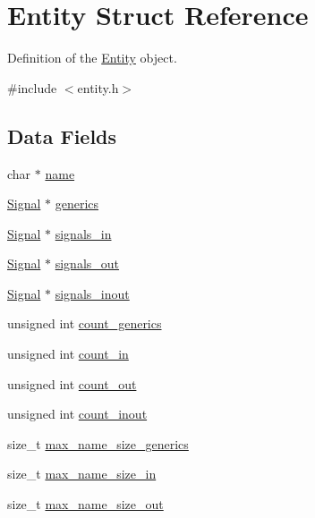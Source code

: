 \hypertarget{struct_entity}{}\section{Entity Struct Reference}
\label{struct_entity}


Definition of the \mbox{\hyperlink{struct_entity}{Entity}} object.  




{\ttfamily \#include $<$entity.\+h$>$}

\subsection*{Data Fields}
\begin{DoxyCompactItemize}
\item 
char $\ast$ \mbox{\hyperlink{struct_entity_a861f653e2ffbe97c0deed7ab85eb7ce6}{name}}
\item 
\mbox{\hyperlink{struct_signal}{Signal}} $\ast$ \mbox{\hyperlink{struct_entity_a92738012e3a6611f840cf0eb2813c2e6}{generics}}
\item 
\mbox{\hyperlink{struct_signal}{Signal}} $\ast$ \mbox{\hyperlink{struct_entity_a52dafc8055e7c6c1b21520fad2d703b2}{signals\+\_\+in}}
\item 
\mbox{\hyperlink{struct_signal}{Signal}} $\ast$ \mbox{\hyperlink{struct_entity_a4b9a333d9fb207c09d9f64e87d986ad6}{signals\+\_\+out}}
\item 
\mbox{\hyperlink{struct_signal}{Signal}} $\ast$ \mbox{\hyperlink{struct_entity_a3a7a0540c9a581600cae6cb8880d4175}{signals\+\_\+inout}}
\item 
unsigned int \mbox{\hyperlink{struct_entity_a20a2de116010cce381f1127dae0b2218}{count\+\_\+generics}}
\item 
unsigned int \mbox{\hyperlink{struct_entity_a92911aaab51c820215510b0546570b64}{count\+\_\+in}}
\item 
unsigned int \mbox{\hyperlink{struct_entity_a0cc932f4ed6b00e372488b3a753674ac}{count\+\_\+out}}
\item 
unsigned int \mbox{\hyperlink{struct_entity_a54b70a8bdd98d2752f6ff9f261c552fd}{count\+\_\+inout}}
\item 
size\+\_\+t \mbox{\hyperlink{struct_entity_a8b0c53c2f6867fd1c011210e63efcaad}{max\+\_\+name\+\_\+size\+\_\+generics}}
\item 
size\+\_\+t \mbox{\hyperlink{struct_entity_ae224ddbebe0375e2b802c08ca7f15dda}{max\+\_\+name\+\_\+size\+\_\+in}}
\item 
size\+\_\+t \mbox{\hyperlink{struct_entity_ade510913e1937e285e677c2b281cb09e}{max\+\_\+name\+\_\+size\+\_\+out}}

\end{DoxyCompactItemize}
